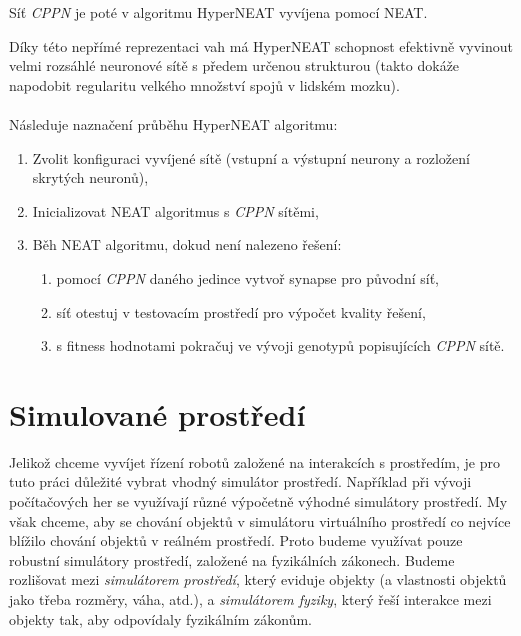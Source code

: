 Síť \emph{CPPN} je poté v algoritmu HyperNEAT vyvíjena pomocí NEAT.

Díky této nepřímé reprezentaci vah má HyperNEAT schopnost efektivně vyvinout
velmi rozsáhlé neuronové sítě s předem určenou strukturou (takto dokáže
napodobit regularitu velkého množství spojů v lidském mozku).

\paragraph{}
Následuje naznačení průběhu HyperNEAT algoritmu:
\begin{enumerate}
    \item Zvolit konfiguraci vyvíjené sítě (vstupní a výstupní neurony a
        rozložení skrytých neuronů),
    \item Inicializovat NEAT algoritmus s \emph{CPPN} sítěmi,
    \item Běh NEAT algoritmu, dokud není nalezeno řešení:
        \begin{enumerate}
            \item pomocí \emph{CPPN} daného jedince vytvoř synapse pro původní
                síť,
            \item síť otestuj v testovacím prostředí pro výpočet kvality
                řešení,
            \item s fitness hodnotami pokračuj ve vývoji genotypů popisujících
                \emph{CPPN} sítě.
        \end{enumerate}
\end{enumerate}

\section{Simulované prostředí} \label{Simulované prostředí}

Jelikož chceme vyvíjet řízení robotů založené na interakcích s prostředím, je
pro tuto práci důležité vybrat vhodný simulátor prostředí. Například při vývoji
počítačových her se využívají různé výpočetně výhodné simulátory prostředí. My
však chceme, aby se chování objektů v simulátoru virtuálního prostředí co
nejvíce blížilo chování objektů v reálném prostředí. Proto budeme využívat
pouze robustní simulátory prostředí, založené na fyzikálních zákonech. Budeme
rozlišovat mezi \emph{simulátorem prostředí}, který eviduje objekty (a
vlastnosti objektů jako třeba rozměry, váha, atd.), a \emph{simulátorem
fyziky}, který řeší interakce mezi objekty tak, aby odpovídaly fyzikálním
zákonům. 

